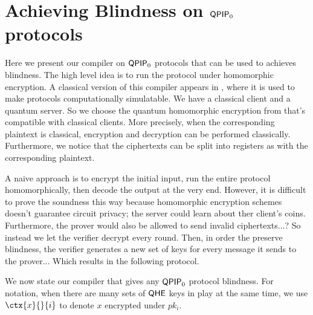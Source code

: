 \section{Achieving Blindness on $\operatorname{\mathsf{QPIP}}_0$ protocols}
\label{sec:BlindBQP2}

Here we present our compiler on $\operatorname{\mathsf{QPIP}}_0$ protocols that can be used to achieves blindness.
The high level idea is to run the protocol under homomorphic encryption.
A classical version of this compiler appears in \cite{KMThesis}, where it is used to make protocols computationally simulatable.
We have a classical client and a quantum server.
So we choose the quantum homomorphic encryption from \cite{mahadev_qfhe} that's compatible with classical clients.
More precisely, when the corresponding plaintext is classical, encryption and decryption can be performed classically.
Furthermore, we notice that the ciphertexts can be split into registers as with the corresponding plaintext.

A naive approach is to encrypt the initial input,
run the entire protocol homomorphically,
then decode the output at the very end.
However, it is difficult to prove the soundness this way because homomorphic encryption schemes doesn't guarantee circuit privacy;
the server could learn about ther client's coins.
Furthermore, the prover would also be allowed to send invalid ciphertexts...?
So instead we let the verifier decrypt every round.
Then, in order the preserve blindness, the verifier generates a new set of keys for every message it sends to the prover...
Which results in the following protocol.


We now state our compiler that gives any $\operatorname{\mathsf{QPIP}}_0$ protocol blindness.
For notation, when there are many sets of $\mathsf{QHE}$ keys in play at the same time,
we use $\ctx{x}{}{i}$ to denote $x$ encrypted under $pk_i$.


